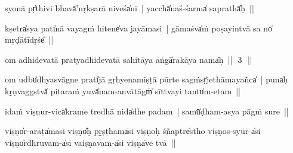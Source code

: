 \documentclass[parskip, DIV=14]{scrartcl}
\begin{document}
syo॒nā pṛ̍thivi॒ bhavā̍'nṛkṣa॒rā ni॒veśa̍nī~| yacchā̍na॒ś-śarma̍ sa॒prathā̎ḥ~||


kṣetra̍sya॒ pati̍nā va॒yagṁ hi॒tene̍va jayāmasi~| gāmaśva̍ṁ poṣayi॒ntvā sa no̍ mṛḍātī॒dṛśe̎~||


om adhidevatā pratyadhidevatā sahitāya aṅgā̍rakāya॒ nama̍ḥ~||~\,3\,~||
\vspace{0.5cm}



om udbu̍dhyasvāgne॒॒ prati̍jā gṛhyenamiṣṭā pū॒rte sagṁsṛ̍jethāma॒yañca̍~| 
puna̍ḥ kṛ̱ṇvaggstvā̍ pi॒tara॒ṁ yuvā̍nam-a॒nvātāgṁ̍ sī॒ttvayi॒ tantu̍m-e॒॒tam~||


i॒daṁ viṣṇu॒r-vica̍krame tre॒॒dhā nida̍dhe pa॒dam~| samū̍ḍham-asya pāgṁ su॒re~||


viṣṇo̍r-a॒rāṭa̍masi॒ viṣṇo̎ḥ pṛ̱ṣṭhama̍si॒ viṣṇo॒ḥ śñaptre̎stho॒ viṣṇo॒s-syūr-a̍si॒ viṣṇo̎rdhru॒vam-a̍si vaiṣṇa॒vam-a̍si॒ viṣṇa̍ve tvā~||
\end{document}
